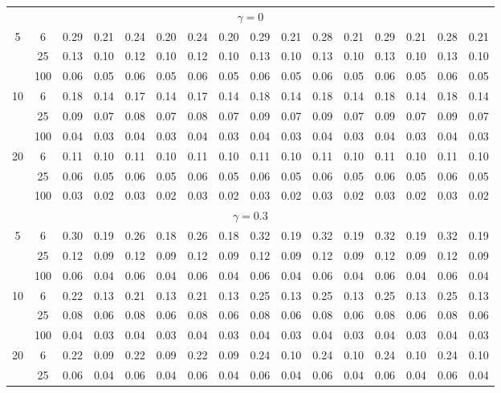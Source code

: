 \documentclass[
  man]{apa6}
\newenvironment{lltable}{\begin{landscape}\centering\begin{ThreePartTable}}{\end{ThreePartTable}\end{landscape}}
\begin{document}
\begin{lltable}
{\begin{longtable}{cccccccccccccccc}
\multicolumn{16}{c}{$\gamma = 0$}\\
5 & 6 & 0.29 & 0.21 & 0.24 & 0.20 & 0.24 & 0.20 & 0.29 & 0.21 & 0.28 & 0.21 & 0.29 & 0.21 & 0.28 & 0.21\\
 & 25 & 0.13 & 0.10 & 0.12 & 0.10 & 0.12 & 0.10 & 0.13 & 0.10 & 0.13 & 0.10 & 0.13 & 0.10 & 0.13 & 0.10\\
 & 100 & 0.06 & 0.05 & 0.06 & 0.05 & 0.06 & 0.05 & 0.06 & 0.05 & 0.06 & 0.05 & 0.06 & 0.05 & 0.06 & 0.05\\
10 & 6 & 0.18 & 0.14 & 0.17 & 0.14 & 0.17 & 0.14 & 0.18 & 0.14 & 0.18 & 0.14 & 0.18 & 0.14 & 0.18 & 0.14\\
 & 25 & 0.09 & 0.07 & 0.08 & 0.07 & 0.08 & 0.07 & 0.09 & 0.07 & 0.09 & 0.07 & 0.09 & 0.07 & 0.09 & 0.07\\
 & 100 & 0.04 & 0.03 & 0.04 & 0.03 & 0.04 & 0.03 & 0.04 & 0.03 & 0.04 & 0.03 & 0.04 & 0.03 & 0.04 & 0.03\\
20 & 6 & 0.11 & 0.10 & 0.11 & 0.10 & 0.11 & 0.10 & 0.11 & 0.10 & 0.11 & 0.10 & 0.11 & 0.10 & 0.11 & 0.10\\
 & 25 & 0.06 & 0.05 & 0.06 & 0.05 & 0.06 & 0.05 & 0.06 & 0.05 & 0.06 & 0.05 & 0.06 & 0.05 & 0.06 & 0.05\\
 & 100 & 0.03 & 0.02 & 0.03 & 0.02 & 0.03 & 0.02 & 0.03 & 0.02 & 0.03 & 0.02 & 0.03 & 0.02 & 0.03 & 0.02\\
\multicolumn{16}{c}{$\gamma = 0.3$}\\
5 & 6 & 0.30 & 0.19 & 0.26 & 0.18 & 0.26 & 0.18 & 0.32 & 0.19 & 0.32 & 0.19 & 0.32 & 0.19 & 0.32 & 0.19\\
 & 25 & 0.12 & 0.09 & 0.12 & 0.09 & 0.12 & 0.09 & 0.12 & 0.09 & 0.12 & 0.09 & 0.12 & 0.09 & 0.12 & 0.09\\
 & 100 & 0.06 & 0.04 & 0.06 & 0.04 & 0.06 & 0.04 & 0.06 & 0.04 & 0.06 & 0.04 & 0.06 & 0.04 & 0.06 & 0.04\\
10 & 6 & 0.22 & 0.13 & 0.21 & 0.13 & 0.21 & 0.13 & 0.25 & 0.13 & 0.25 & 0.13 & 0.25 & 0.13 & 0.25 & 0.13\\
 & 25 & 0.08 & 0.06 & 0.08 & 0.06 & 0.08 & 0.06 & 0.08 & 0.06 & 0.08 & 0.06 & 0.08 & 0.06 & 0.08 & 0.06\\
 & 100 & 0.04 & 0.03 & 0.04 & 0.03 & 0.04 & 0.03 & 0.04 & 0.03 & 0.04 & 0.03 & 0.04 & 0.03 & 0.04 & 0.03\\
20 & 6 & 0.22 & 0.09 & 0.22 & 0.09 & 0.22 & 0.09 & 0.24 & 0.10 & 0.24 & 0.10 & 0.24 & 0.10 & 0.24 & 0.10\\
 & 25 & 0.06 & 0.04 & 0.06 & 0.04 & 0.06 & 0.04 & 0.06 & 0.04 & 0.06 & 0.04 & 0.06 & 0.04 & 0.06 & 0.04\\

\end{longtable}}
\end{lltable}
\end{document}
